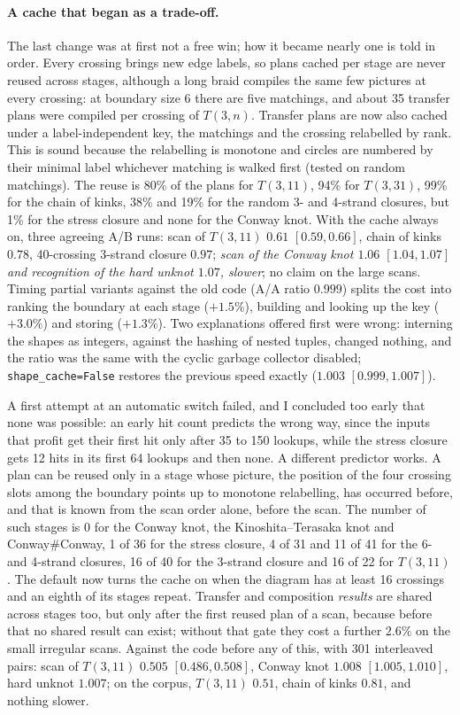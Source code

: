 \paragraph{A cache that began as a trade-off.} The last change was at first not
a free win; how it became nearly one is told in order. Every crossing brings new edge labels, so plans cached per
stage are never reused across stages, although a long braid compiles the same
few pictures at every crossing: at boundary size 6 there are five matchings,
and about 35 transfer plans were compiled per crossing of $T(3,n)$. Transfer
plans are now also cached under a label-independent key, the matchings and the
crossing relabelled by rank. This is sound because the relabelling is monotone
and circles are numbered by their minimal label whichever matching is walked
first (tested on random matchings). The reuse is 80\% of the plans for
$T(3,11)$, 94\% for $T(3,31)$, 99\% for the chain of kinks, 38\% and 19\% for
the random 3- and 4-strand closures, but 1\% for the stress closure and none
for the Conway knot. With the cache always on, three agreeing A/B runs: scan of $T(3,11)$ $0.61$
$[0.59, 0.66]$, chain of kinks $0.78$, 40-crossing 3-strand closure $0.97$;
\emph{scan of the Conway knot $1.06$ $[1.04, 1.07]$ and recognition of the hard
unknot $1.07$, slower}; no claim on the large scans. Timing partial variants
against the old code (A/A ratio $0.999$) splits the cost into ranking the
boundary at each stage ($+1.5\%$), building and looking up the key ($+3.0\%$)
and storing ($+1.3\%$). Two explanations offered first were wrong: interning
the shapes as integers, against the hashing of nested tuples, changed nothing,
and the ratio was the same with the cyclic garbage collector disabled;
\texttt{shape\_cache=False} restores the previous speed exactly ($1.003$
$[0.999, 1.007]$).

A first attempt at an automatic switch failed, and I concluded too early that
none was possible: an early hit count predicts the wrong way, since the inputs
that profit get their first hit only after 35 to 150 lookups, while the stress
closure gets 12 hits in its first 64 lookups and then none. A different
predictor works. A plan can be reused only in a stage whose picture, the
position of the four crossing slots among the boundary points up to monotone
relabelling, has occurred before, and that is known from the scan order alone,
before the scan. The number of such stages is 0 for the Conway knot, the
Kinoshita--Terasaka knot and Conway\#Conway, 1 of 36 for the stress closure,
4 of 31 and 11 of 41 for the 6- and 4-strand closures, 16 of 40 for the
3-strand closure and 16 of 22 for $T(3,11)$. The default now turns the cache on
when the diagram has at least 16 crossings and an eighth of its stages repeat.
Transfer and composition \emph{results} are shared across stages too, but only
after the first reused plan of a scan, because before that no shared result can
exist; without that gate they cost a further $2.6\%$ on the small irregular
scans. Against the code before any of this, with 301 interleaved pairs: scan of
$T(3,11)$ $0.505$ $[0.486, 0.508]$, Conway knot $1.008$ $[1.005, 1.010]$, hard
unknot $1.007$; on the corpus, $T(3,11)$ $0.51$, chain of kinks $0.81$, and
nothing slower.

